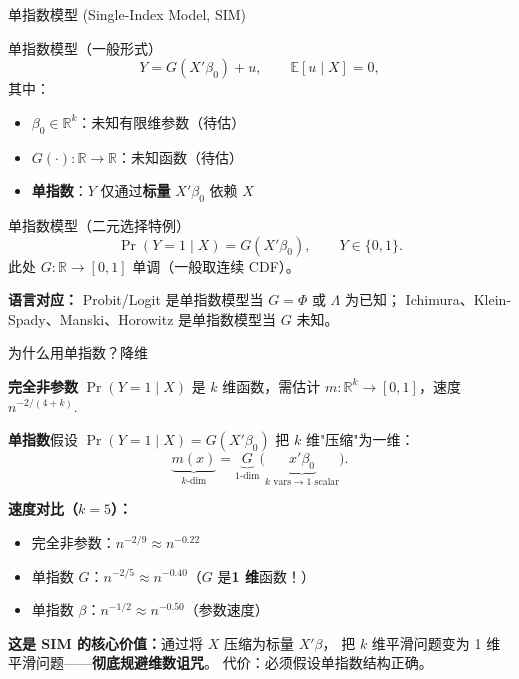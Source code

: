 \documentclass[aspectratio=169, 10pt]{beamer}
\begin{document}
\begin{frame}{单指数模型 (Single-Index Model, SIM)}

  \begin{definitionbox}{{单指数模型（一般形式）}}
    $$Y = G(X'\beta_0) + u, \qquad \mathbb{E}[u\mid X] = 0,$$
    其中：
    \begin{itemize}\setlength{\itemsep}{1pt}
      \item \textbf{$\beta_0 \in \mathbb{R}^k$}：未知有限维参数（待估）
      \item \textbf{$G(\cdot): \mathbb{R} \to \mathbb{R}$}：未知函数（待估）
      \item \textbf{单指数}：$Y$ 仅通过\textbf{标量} $X'\beta_0$ 依赖 $X$
    \end{itemize}
  \end{definitionbox}

  \begin{definitionbox}{{单指数模型（二元选择特例）}}
    $$\Pr(Y=1\mid X) = G(X'\beta_0), \qquad Y \in \{0, 1\}.$$
    此处 $G: \mathbb{R} \to [0, 1]$ 单调（一般取连续 CDF）。
  \end{definitionbox}

  \begin{keybox}
    \textbf{语言对应：}
    Probit/Logit 是单指数模型当 $G = \Phi$ 或 $\Lambda$ 为已知；
    Ichimura、Klein-Spady、Manski、Horowitz 是单指数模型当 $G$ 未知。
  \end{keybox}

\end{frame}

\begin{frame}{为什么用单指数？降维}

  \textbf{完全非参数} $\Pr(Y=1\mid X)$ 是 $k$ 维函数，需估计
  $m: \mathbb{R}^k \to [0,1]$，速度 $n^{-2/(4+k)}$.

  \textbf{单指数}假设 $\Pr(Y=1\mid X) = G(X'\beta_0)$ 把 $k$ 维"压缩"为一维：
  $$\underbrace{m(x)}_{k\text{-dim}}
  = \underbrace{G}_{1\text{-dim}}\!\bigl(\underbrace{x'\beta_0}_{k \text{ vars} \to 1\text{ scalar}}\bigr).$$

  \begin{highlightbox}
    \textbf{速度对比（$k=5$）：}
    \begin{itemize}\setlength{\itemsep}{1pt}
      \item 完全非参数：$n^{-2/9} \approx n^{-0.22}$
      \item 单指数 $G$：$n^{-2/5} \approx n^{-0.40}$（$G$ 是\textbf{1 维}函数！）
      \item 单指数 $\beta$：$n^{-1/2} \approx n^{-0.50}$（参数速度）
    \end{itemize}
  \end{highlightbox}

  \begin{keybox}
    \textbf{这是 SIM 的核心价值：}通过将 $X$ 压缩为标量 $X'\beta$，
    把 $k$ 维平滑问题变为 1 维平滑问题——\textbf{彻底规避维数诅咒}。
    代价：必须假设单指数结构正确。
  \end{keybox}

\end{frame}
\end{document}
